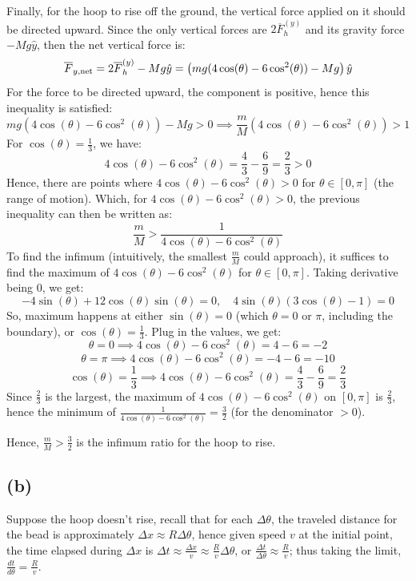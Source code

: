 \documentclass{article}
\newcommand{\bF}{\overline{F}}
\begin{document}
\hfil

Finally, for the hoop to rise off the ground, the vertical force applied on it should be directed upward. Since the only vertical forces are $2\bF_h^{(y)}$ and its gravity force $-Mg\hat{y}$, then the net vertical force is:
$$\bF_{y,\textmd{net}} = 2\bF_h^{(y)}-Mg\hat{y} = \left(mg(4\cos(\theta)-6\cos^2(\theta))-Mg\right)\hat{y}$$
For the force to be directed upward, the component is positive, hence this inequality is satisfied:
$$mg(4\cos(\theta)-6\cos^2(\theta))-Mg>0 \implies \frac{m}{M}(4\cos(\theta)-6\cos^2(\theta))>1$$ 
For $\cos(\theta)= \frac{1}{3}$, we have:
$$4\cos(\theta)-6\cos^2(\theta) =\frac{4}{3}-\frac{6}{9} = \frac{2}{3}>0$$
Hence, there are points where $4\cos(\theta)-6\cos^2(\theta)>0$ for $\theta\in [0,\pi]$ (the range of motion). Which, for $4\cos(\theta)-6\cos^2(\theta)>0$, the previous inequality can then be written as:
$$\frac{m}{M}>\frac{1}{4\cos(\theta)-6\cos^2(\theta)}$$
To find the infimum (intuitively, the smallest $\frac{m}{M}$ could approach), it suffices to find the maximum of $4\cos(\theta)-6\cos^2(\theta)$ for $\theta\in [0,\pi]$. Taking derivative being $0$, we get:
$$-4\sin(\theta)+12\cos(\theta)\sin(\theta)=0,\quad 4\sin(\theta)(3\cos(\theta)-1)=0$$
So, maximum happens at either $\sin(\theta)=0$ (which $\theta=0$ or $\pi$, including the boundary), or $\cos(\theta)=\frac{1}{3}$. Plug in the values, we get:
$$\theta=0\implies 4\cos(\theta)-6\cos^2(\theta) = 4-6=-2$$
$$\theta=\pi\implies 4\cos(\theta)-6\cos^2(\theta)=-4-6 = -10$$
$$\cos(\theta)=\frac{1}{3}\implies 4\cos(\theta)-6\cos^2(\theta) = \frac{4}{3}-\frac{6}{9} = \frac{2}{3}$$
Since $\frac{2}{3}$ is the largest, the maximum of $4\cos(\theta)-6\cos^2(\theta)$ on $[0,\pi]$ is $\frac{2}{3}$, hence the minimum of $\frac{1}{4\cos(\theta)-6\cos^2(\theta)} = \frac{3}{2}$ (for the denominator $>0$).

Hence, $\frac{m}{M}>\frac{3}{2}$ is the infimum ratio for the hoop to rise.
\subsection*{(b)}
Suppose the hoop doesn't rise, recall that for each $\Delta\theta$, the traveled distance for the bead is approximately $\Delta x\approx R\Delta\theta$, hence given speed $v$ at the initial point, the time elapsed during $\Delta x$ is $\Delta t\approx \frac{\Delta x}{v} \approx \frac{R}{v}\Delta \theta$, or $\frac{\Delta t}{\Delta\theta}\approx \frac{R}{v}$; thus taking the limit, $\frac{dt}{d\theta}=\frac{R}{v}$. 
\end{document}
